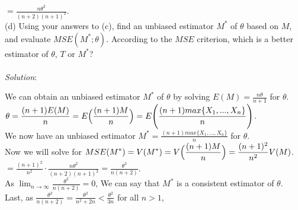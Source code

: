 \documentclass[12pt]{article}
\newcommand{\XB}{\color{black}}
\newcommand{\XV}{\color{violet}}
\begin{document}
$ \displaystyle = \frac{n\theta^{2}}{(n + 2)(n + 1)^{2}} $. \\



(d) Using your answers to (c), find an unbiased estimator $ M^{*} $ of $ \theta $ based on $ M $, and evaluate $ MSE(M^{*}; \theta) $. According to the $ MSE $ criterion, which is a better estimator of $ \theta $, $ T $ or $ M^{*} $?  \\
\vspace{2.5mm} \\
\textit{Solution}:
\vspace{2.5mm}

\noindent 
We can obtain an unbiased estimator $ M^{*} $ of $ \theta $ by solving $ \displaystyle E(M) = \frac{n\theta}{n + 1} $ for $ \theta $. \\

\noindent
$ \displaystyle \theta = \frac{(n + 1)E(M)}{n} = E\Bigl( \frac{(n + 1)M}{n} \Bigr) = E\Biggl( \frac{(n + 1)max\{X_{1},...,X_{n}\}}{n} \Biggr) $. \\

\noindent
We now have an unbiased estimator $ \displaystyle M^{*} = \frac{(n + 1)max\{X_{1},...,X_{n}\}}{n} $ for $ \theta $. \\

\noindent
Now we will solve for $ \displaystyle MSE(M^{*}) = V(M^{*}) = V\Bigl( \frac{(n + 1)M}{n} \Bigr) = \frac{(n + 1)^{2}}{n^{2}} V(M) $. \\

$ \displaystyle = \frac{(n + 1)^{2}}{n^{2}} \cdot \frac{n\theta^{2}}{(n + 2)(n + 1)^{2}} = \frac{\theta^{2}}{n(n + 2)} $. \\

\noindent
As $ \displaystyle \lim_{n \to \infty} \frac{\theta^{2}}{n(n + 2)} = 0 $, We can say that $ M^{*} $ is a consistent estimator of $ \theta $. \\

Last, as $ \displaystyle \frac{\theta^{2}}{n(n + 2)} = \frac{\theta^{2}}{n^{2} + 2n} < \frac{\theta^{2}}{3n} $ for all $ n > 1 $, \\
\end{document}
